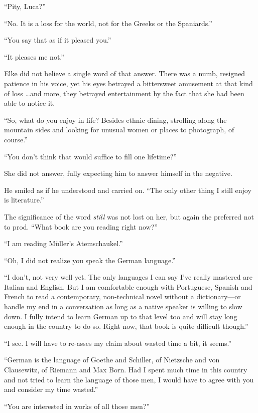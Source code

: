 ``Pity, Luca?''

``No. It is a loss for the world, not for the Greeks or the Spaniards.''

``You say that as if it pleased you.''

``It pleases me not.''

Elke did not believe a single word of that answer. There was a numb, resigned patience in his voice, yet his eyes betrayed a bittersweet amusement at that kind of loss \ldots and more, they betrayed entertainment by the fact that she had been able to notice it.

``So, what do you enjoy in life? Besides ethnic dining, strolling along the mountain sides and looking for unusual women or places to photograph, of course.''

``You don't think that would suffice to fill one lifetime?''

She did not answer, fully expecting him to answer himself in the negative.

He smiled as if he understood and carried on. ``The only other thing I still enjoy is literature.''

The significance of the word \emph{still} was not lost on her, but again she preferred not to prod. ``What book are you reading right now?''

``I am reading Müller's Atemschaukel.''

``Oh, I did not realize you speak the German language.''

``I don't, not very well yet. The only languages I can say I've really mastered are Italian and English. But I am comfortable enough with Portuguese, Spanish and French to read a contemporary, non-technical novel without a dictionary---or handle my end in a conversation as long as a native speaker is willing to slow down. I fully intend to learn German up to that level too and will stay long enough in the country to do so. Right now, that book is quite difficult though.''

``I see. I will have to re-asses my claim about wasted time a bit, it seems.''

``German is the language of \mbox{Goethe} and \mbox{Schiller}, of \mbox{Nietzsche} and von \mbox{Clausewitz}, of \mbox{Riemann} and Max Born. Had I spent much time in this country and not tried to learn the language of those men, I would have to agree with you and consider my time wasted.''

``You are interested in works of all those men?''

